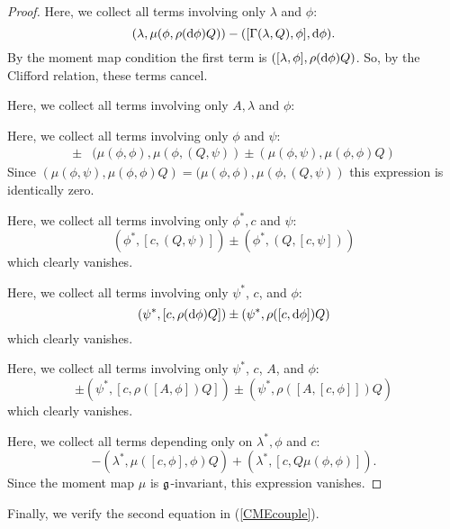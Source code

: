 \documentclass[10pt, oneside]{article}
\begin{document}
\begin{proof}
Here, we collect all terms involving only $\lambda$ and $\phi$:
\[
(\lambda, \mu( \phi, \rho({\rm d} \phi)Q)) - ([\Gamma(\lambda, Q), \phi], {\rm d} \phi). 
\]
By the moment map condition the first term is $([\lambda, \phi], \rho({\rm d} \phi) Q)$. 
So, by the Clifford relation, these terms cancel. 

Here, we collect all terms involving only $A, \lambda$ and $\phi$:

Here, we collect all terms involving only $\phi$ and $\psi$:
\begin{align*}
\pm & (\mu(\phi, \phi) , \mu(\phi, (Q, \psi)) \pm (\mu(\phi, \psi), \mu(\phi,\phi)Q)
\end{align*}
Since $(\mu(\phi, \psi), \mu(\phi,\phi)Q) = (\mu(\phi, \phi) , \mu(\phi, (Q, \psi))$ this expression is identically zero. 

Here, we collect all terms involving only $\phi^*, c$ and $\psi$:
\[
(\phi^*, [c, (Q, \psi)]) \pm (\phi^*, (Q, [c,\psi])) 
\]
which clearly vanishes. 

Here, we collect all terms involving only $\psi^*$, $c$, and $\phi$:
\[
(\psi^*, [c, \rho({\rm d} \phi) Q]) \pm (\psi^*, \rho( [c ,{\rm d} \phi ]) Q) 
\]
which clearly vanishes. 

Here, we collect all terms involving only $\psi^*$, $c$, $A$, and $\phi$:
\[
\pm (\psi^*, [c, \rho([A,\phi]) Q]) \pm (\psi^*, \rho([A,[c,\phi]]) Q) 
\]
which clearly vanishes. 

Here, we collect all terms depending only on $\lambda^*, \phi$ and $c$:
\[
- (\lambda^*, \mu([c, \phi], \phi) Q) + (\lambda^*, [c, Q \mu(\phi,\phi)]) .
\]
Since the moment map $\mu$ is $\mathfrak g$-invariant, this expression vanishes. 
\end{proof}

Finally, we verify the second equation in (\ref{CMEcouple}). 
\end{document}
